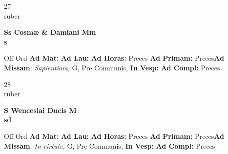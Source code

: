 \documentclass[10pt, openany]{book}
\begin{document}
    \begin{center}
        \begin{minipage}{3.5in}
            \vspace{2em}
            \begin{minipage}{0.5in}
                {\Huge 27} \\
                {\normalsize ruber}
            \end{minipage}
            \begin{minipage}{3.0in}
                \textbf{ \large Ss Cosmæ \& Damiani Mm \\
                \textnormal{\normalsize s}}

            \end{minipage}
            \begin{justify}Off Ord
                \textbf{Ad Mat: }
                \textbf{Ad Lau: }
                \textbf{Ad Horas: }Preces
                \textbf{Ad Primam: }Preces\textbf{Ad Missam}: \textit{Sapientiam,} G, Pre Communis, 
                \textbf{In Vesp: }
                \textbf{Ad Compl: }Preces
            \end{justify}
        \end{minipage}
    \end{center}

    \begin{center}
        \begin{minipage}{3.5in}
            \vspace{2em}
            \begin{minipage}{0.5in}
                {\Huge 28} \\
                {\normalsize ruber}
            \end{minipage}
            \begin{minipage}{3.0in}
                \textbf{ \large S Wenceslai Ducis M \\
                \textnormal{\normalsize sd}}

            \end{minipage}
            \begin{justify}Off Ord
                \textbf{Ad Mat: }
                \textbf{Ad Lau: }
                \textbf{Ad Horas: }Preces
                \textbf{Ad Primam: }Preces\textbf{Ad Missam}: \textit{In virtute,} G, Pre Communis, 
                \textbf{In Vesp: }
                \textbf{Ad Compl: }Preces
            \end{justify}
        \end{minipage}
    \end{center}
\end{document}

